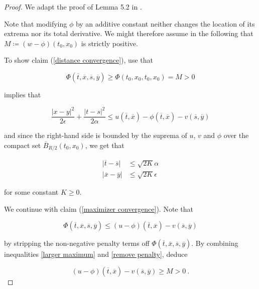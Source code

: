 \begin{lemma}
	 	\begin{proof}
	 		We adapt the proof of Lemma 5.2 in \cite[p.~69]{barles}.
	 		
	 		Note that modifying $ \phi $ by an additive constant neither changes the location of its extrema nor its total derivative. We might therefore assume in the following that $ M \coloneqq (w - \phi)(t_0, x_0)  $ is strictly positive.
	 		
	 		To show claim (\ref{distance convergence}), use that
	 		
	 		\begin{equation}
	 			\label{larger maximum}
	 			\Phi(\overline{t}, \overline{x}, \overline{s}, \overline{y}) \geq \Phi(t_0, x_0, t_0, x_0) = M > 0
	 		\end{equation}
	 		
	 		implies that
	 		
	 		\begin{equation*}
	 			\frac{\lvert x - y \rvert^2 }{2 \epsilon} + \frac{\lvert t - s \rvert^2}{2 \alpha} \leq u(\overline{t}, \overline{x}) - \phi(\overline{t}, \overline{x}) - v(\overline{s}, \overline{y})
	 		\end{equation*}
	 		
	 		and since the right-hand side is bounded by the suprema of $ u $, $ v $ and $ \phi $ over the compact set $ \overline{B}_{R / 2}(t_0, x_0) $, we get that
	 		
	 		\begin{align*}
	 			\lvert \overline{t} - \overline{s} \rvert &\leq \sqrt{2 K} \alpha \\
	 			\lvert \overline{x} - \overline{y} \rvert &\leq \sqrt{2 K} \epsilon
	 		\end{align*}
	 		
	 		for some constant $ K \geq 0 $.
	 		
	 		We continue with claim (\ref{maximizer convergence}). Note that
	 		
	 		\begin{equation}
	 		\label{remove penalty}
	 			\Phi(\overline{t}, \overline{x}, \overline{s}, \overline{y}) \leq
	 			(u - \phi)(\overline{t}, \overline{x}) - v(\overline{s}, \overline{y}) 
	 		\end{equation}
	 		
	 		by stripping the non-negative penalty terms off $ \Phi(\overline{t}, \overline{x}, \overline{s}, \overline{y}) $. By combining inequalities \ref{larger maximum} and \ref{remove penalty}, deduce
	 		
	 		\begin{equation}
	 			\label{maximum convergence}
	 			(u - \phi)(\overline{t}, \overline{x}) - v(\overline{s}, \overline{y}) \geq M > 0 \ .
	 		\end{equation}
	 		

\end{proof}
\end{lemma}
